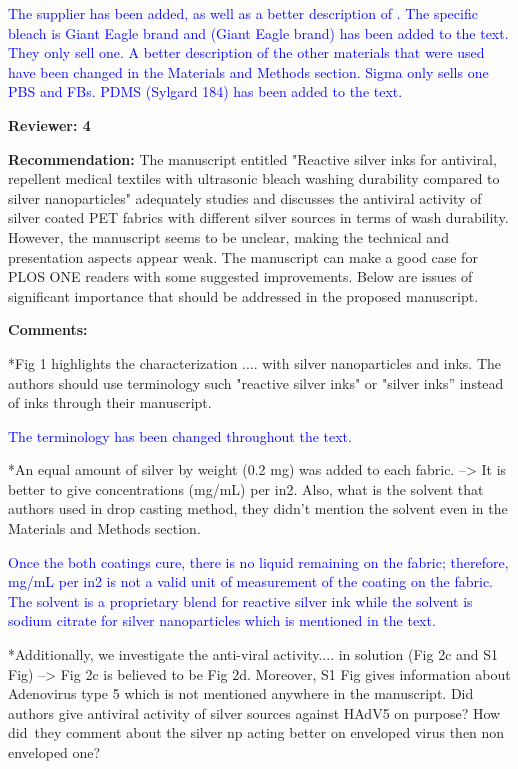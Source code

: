 \documentclass[12pt]{letter}
\newcommand{\blue}[1]{\textcolor{blue}{#1}} %
\begin{document}
\blue{The supplier has been added, as well as a better description of . The specific bleach is Giant Eagle brand and (Giant Eagle brand) has been added to the text. They only sell one. A better description of the other materials that were used have been changed in the Materials and Methods section. Sigma only sells one PBS and FBs. PDMS (Sylgard 184) has been added to the text. }

\newpage
\textbf{Reviewer: 4}

\textbf{Recommendation:} 
The manuscript entitled "Reactive silver inks for antiviral, repellent medical textiles with ultrasonic bleach washing durability compared to silver nanoparticles" adequately studies and discusses the antiviral activity of silver coated PET fabrics with different silver sources in terms of wash durability. However, the manuscript seems to be unclear, making the technical and presentation aspects appear weak. The manuscript can make a good case for PLOS ONE readers with some suggested improvements. Below are issues of significant importance that should be addressed in the proposed manuscript.

\textbf{Comments:} 

*Fig 1 highlights the characterization .... with silver nanoparticles and inks. The authors should use terminology such "reactive silver inks" or "silver inks” instead of inks through their manuscript.

\blue{The terminology has been changed throughout the text. }

*An equal amount of silver by weight (0.2 mg) was added to each fabric. --> It is better to give concentrations (mg/mL) per in2. Also, what is the solvent that authors used in drop casting method, they didn't mention the solvent even in the Materials and Methods section.

\blue{Once the both coatings cure, there is no liquid remaining on the fabric; therefore, mg/mL per in2 is not a valid unit of measurement of the coating on the fabric. The solvent is a proprietary blend for reactive silver ink while the solvent is sodium citrate for silver nanoparticles which is mentioned in the text. }

*Additionally, we investigate the anti-viral activity.... in solution (Fig 2c and S1 Fig) --> Fig 2c is believed to be Fig 2d. Moreover, S1 Fig gives information about Adenovirus type 5 which is not mentioned anywhere in the manuscript. Did authors give antiviral activity of silver sources against HAdV5 on purpose? How did\ they comment about the silver np acting better on enveloped virus then non enveloped one?
\end{document}
